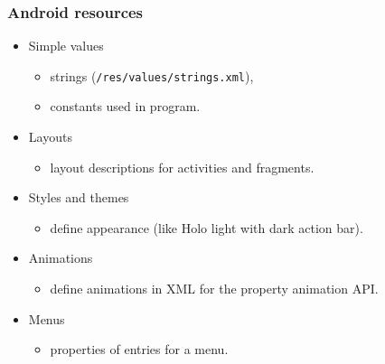 \documentclass[10pt,xcolor=pdflatex]{beamer}
\begin{document}
\begin{frame}\frametitle{Android resources}
	\begin{itemize}
		\item Simple values
          \begin{itemize}
        	\item strings (\texttt{/res/values/strings.xml}),
        	\item constants used in program.
          \end{itemize}
		\item Layouts
          \begin{itemize}
        	\item layout descriptions for activities and fragments.
          \end{itemize}
		\item Styles and themes
          \begin{itemize}
        	\item define appearance (like Holo light with dark action bar).
          \end{itemize}
		\item Animations
          \begin{itemize}
        	\item define animations in XML for the property animation API.
          \end{itemize}
		\item Menus
          \begin{itemize}
        	\item properties of entries for a menu.
          \end{itemize}
	\end{itemize}
\end{frame}
\end{document}
